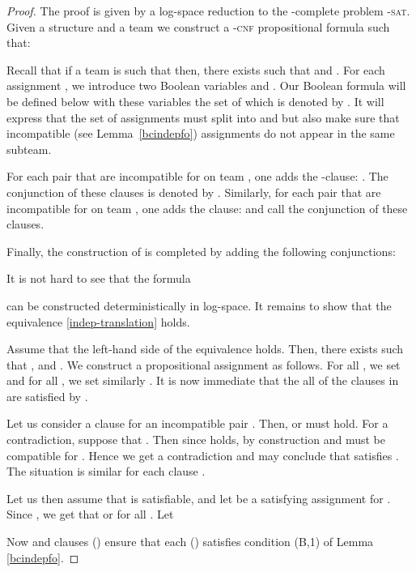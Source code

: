 \documentclass{article}
\theoremstyle{plain}
\theoremstyle{definition}
\newcommand{\pb}[1]{\textsc{#1}}
\begin{document}
\begin{proof} 
The proof is given by a log-space reduction to the -complete problem -\pb{sat}.
Given a structure  and a  team  we  construct a -\pb{cnf} propositional formula  such that:


 Recall that if a team  is such that   then, there exists  such that  and .
For each assignment , we introduce two Boolean variables  and . Our Boolean formula  will be defined below with these   variables the set of which is denoted by . It will express that the set of assignments must split into  and  but also make sure that incompatible (see Lemma~\ref{bcindepfo}) assignments do not appear in the same subteam. 
 
For each pair  that are incompatible for  on team , one adds the -clause: . The conjunction of these clauses is denoted by .
Similarly, for each pair  that are incompatible for  on team , one adds the clause:  and call   the conjunction of these clauses.

Finally, the construction of  is completed by adding the following conjunctions:





It is not hard to see  that the  formula
 
  can be constructed deterministically in log-space.
 It remains to show that the equivalence \eqref{indep-translation} holds.
 
Assume that the left-hand side of the equivalence holds. Then, there exists  such that ,  and  .
We construct a propositional assignment  as follows. For all , we set  and for all , we set similarly . It is now immediate that the all of the clauses in   are satisfied by .
 
 Let us consider a clause   for an incompatible pair . Then,  or  must hold. For a contradiction, suppose that . Then since  holds, by construction  and  must be compatible for . Hence we get a contradiction and may conclude that  satisfies . The situation is similar for each clause . 

Let us then assume that   is satisfiable, and let  be a satisfying assignment for . Since , we get that  or  for all  . Let 
   
 Now  and clauses   () ensure that each  () satisfies condition (B,1) of Lemma   \ref{bcindepfo}.
 

\end{proof}
\end{document}
